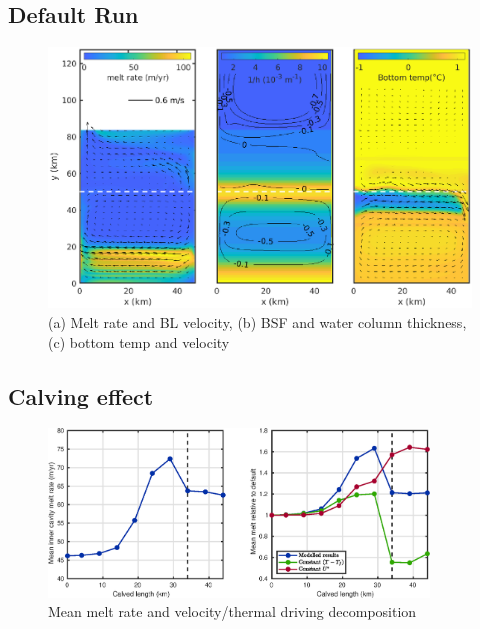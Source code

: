 \documentclass[draft]{agujournal2019}
\begin{document}
\subsection{Default Run}
\begin{figure}
    \centering
    \includegraphics[width = 1.15\textwidth]{../make_figures/plots/figure3.eps}
    \caption{(a) Melt rate and BL velocity, (b) BSF and water column thickness, (c) bottom temp and velocity}
    \label{fig:my_label}
\end{figure}

\subsection{Calving effect}
\begin{figure}
    \centering
    \includegraphics[width = 0.9\textwidth]{../make_figures/plots/figure4.eps}
    \caption{Mean melt rate and velocity/thermal driving decomposition}
    \label{fig:my_label}
\end{figure}
\end{document}

